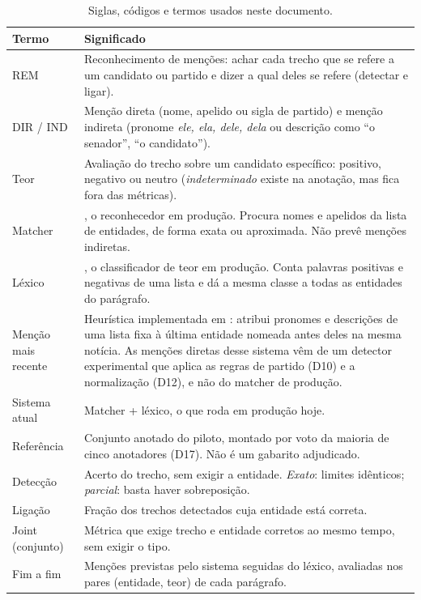 \documentclass[11pt,a4paper]{article}
\begin{document}
\begin{table}[H]
\centering\small
\caption{Siglas, códigos e termos usados neste documento.}\label{tab:glossario}
\begin{tabularx}{\textwidth}{@{}p{3.6cm}L@{}}
\toprule
Termo & Significado \\
\midrule
REM & Reconhecimento de menções: achar cada trecho que se refere a um candidato ou partido e dizer a qual deles se refere (detectar e ligar). \\
DIR / IND & Menção direta (nome, apelido ou sigla de partido) e menção indireta (pronome \emph{ele, ela, dele, dela} ou descrição como \enquote{o senador}, \enquote{o candidato}). \\
Teor & Avaliação do trecho sobre um candidato específico: positivo, negativo ou neutro (\emph{indeterminado} existe na anotação, mas fica fora das métricas). \\
Matcher & , o reconhecedor em produção. Procura nomes e apelidos da lista de entidades, de forma exata ou aproximada. Não prevê menções indiretas. \\
Léxico & , o classificador de teor em produção. Conta palavras positivas e negativas de uma lista e dá a mesma classe a todas as entidades do parágrafo. \\
Menção mais recente & Heurística implementada em : atribui pronomes e descrições de uma lista fixa à última entidade nomeada antes deles na mesma notícia. As menções diretas desse sistema vêm de um detector experimental que aplica as regras de partido (D10) e a normalização (D12), e não do matcher de produção. \\
Sistema atual & Matcher + léxico, o que roda em produção hoje. \\
Referência & Conjunto anotado do piloto, montado por voto da maioria de cinco anotadores (D17). Não é um gabarito adjudicado. \\
Detecção & Acerto do trecho, sem exigir a entidade. \emph{Exato}: limites idênticos; \emph{parcial}: basta haver sobreposição. \\
Ligação & Fração dos trechos detectados cuja entidade está correta. \\
Joint (conjunto) & Métrica que exige trecho e entidade corretos ao mesmo tempo, sem exigir o tipo. \\
Fim a fim & Menções previstas pelo sistema seguidas do léxico, avaliadas nos pares (entidade, teor) de cada parágrafo. \\

\end{tabularx}
\end{table}
\end{document}
